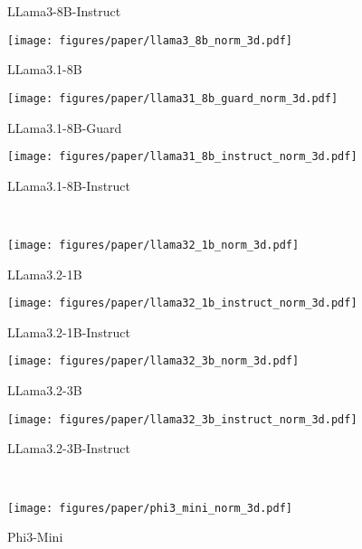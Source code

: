 \begin{figure*}[!t]
\begin{subfigure}[t]{0.23\textwidth}
        \caption{LLama3-8B-Instruct}\label{fig:llama3_8b_instruct_norm_3d}
    \end{subfigure}
    \begin{subfigure}[t]{0.23\textwidth}
        \texttt{[image: figures/paper/llama3\_8b\_norm\_3d.pdf]}
        \caption{LLama3.1-8B}\label{fig:llama31_8b_norm_3d}
    \end{subfigure}
    \begin{subfigure}[t]{0.23\textwidth}
        \texttt{[image: figures/paper/llama31\_8b\_guard\_norm\_3d.pdf]}
        \caption{LLama3.1-8B-Guard}\label{fig:llama31_8b_guard_norm_3d}
    \end{subfigure}
    \begin{subfigure}[t]{0.23\textwidth}
        \texttt{[image: figures/paper/llama31\_8b\_instruct\_norm\_3d.pdf]}
        \caption{LLama3.1-8B-Instruct}\label{fig:llama31_8b_instruct_norm_3d}
    \end{subfigure}\\
    \begin{subfigure}[t]{0.23\textwidth}
        \texttt{[image: figures/paper/llama32\_1b\_norm\_3d.pdf]}
        \caption{LLama3.2-1B}\label{fig:llama32_1b_norm_3d}
    \end{subfigure}
    \begin{subfigure}[t]{0.23\textwidth}
        \texttt{[image: figures/paper/llama32\_1b\_instruct\_norm\_3d.pdf]}
        \caption{LLama3.2-1B-Instruct}\label{fig:llama32_1b_instruct_norm_3d}
    \end{subfigure}
    \begin{subfigure}[t]{0.23\textwidth}
        \texttt{[image: figures/paper/llama32\_3b\_norm\_3d.pdf]}
        \caption{LLama3.2-3B}\label{fig:llama32_3b_norm_3d}
    \end{subfigure}
    \begin{subfigure}[t]{0.23\textwidth}
        \texttt{[image: figures/paper/llama32\_3b\_instruct\_norm\_3d.pdf]}
        \caption{LLama3.2-3B-Instruct}\label{fig:llama32_3b_instruct_norm_3d}
    \end{subfigure}\\
    \begin{subfigure}[t]{0.23\textwidth}
        \texttt{[image: figures/paper/phi3\_mini\_norm\_3d.pdf]}
        \caption{Phi3-Mini}\label{fig:phi3_mini_norm_3d}
    \end{subfigure}
    \begin{subfigure}[t]{0.23\textwidth}

\end{subfigure}
\end{figure*}
